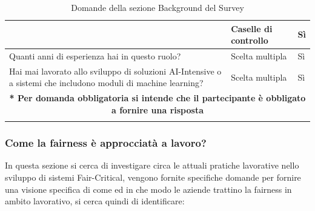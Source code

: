 \begin{longtable}{| p{} | p{} | p{} |}
&  Caselle di controllo

& Sì

\\ \hline
Quanti anni di esperienza hai in questo ruolo?        

&  Scelta multipla

& Sì



\\ \hline
\rowcolor{Gray}
Hai mai lavorato allo sviluppo di soluzioni AI-Intensive o a sistemi che includono moduli di machine learning?        

&  Scelta multipla

& Sì

\\ \hline
\multicolumn{3}{|c|}{\footnotesize \textbf{* Per domanda obbligatoria si intende che il partecipante è obbligato a fornire una risposta}}
\\\hline
\caption{Domande della sezione Background del Survey} %
\label{tab:myfirstlongtable}
\end{longtable}

    
   \subsubsection{Come la fairness è approcciatà a lavoro?}
   
   In questa sezione si cerca di investigare circa le attuali pratiche lavorative nello sviluppo di sistemi Fair-Critical, vengono fornite specifiche domande per fornire una visione specifica di come ed in che modo le aziende trattino la fairness in ambito lavorativo, si cerca quindi di identificare:
   

